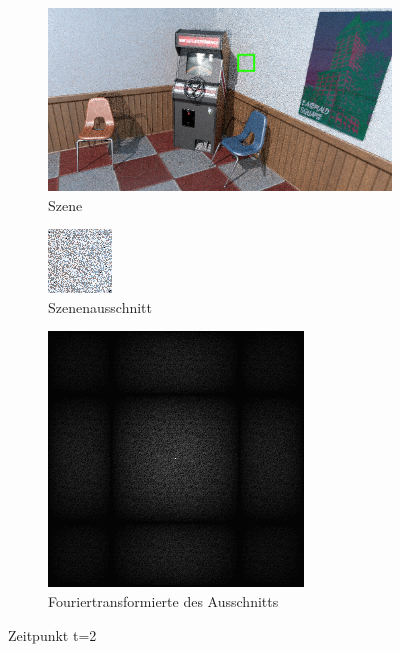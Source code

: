 \begin{figure}[H]
    \begin{subfigure}{\textwidth}
        \centering \includegraphics[scale=.25]{content/TemporalerAlg/Bilder/Sorting/Szene/Szene2.png}
        \caption{Szene}
        \label{fig:Nur_Sorting_Szene_t2}
    \end{subfigure}
    \begin{subfigure}{0.5\textwidth}
        \centering\includegraphics[width=0.4\linewidth]{content/TemporalerAlg/Bilder/Sorting/Ausschnitte/Ausschnitt2.png} 
        \caption{Szenenausschnitt}
        \label{fig:Nur_Sorting_ausschnitt_t2}
    \end{subfigure}
    \begin{subfigure}{0.5\textwidth}
        \centering\includegraphics[width=0.4\linewidth]{content/TemporalerAlg/Bilder/Sorting//Spektren/Ausschnitt2.png}
        \caption{Fouriertransformierte des Ausschnitts}
        \label{fig:Nur_Sorting_Fouriertransformierte_t2}
    \end{subfigure}
        \caption{Zeitpunkt t=2}
        \label{fig:Nur_Sorting_Verlauf_t2}
\end{figure}

